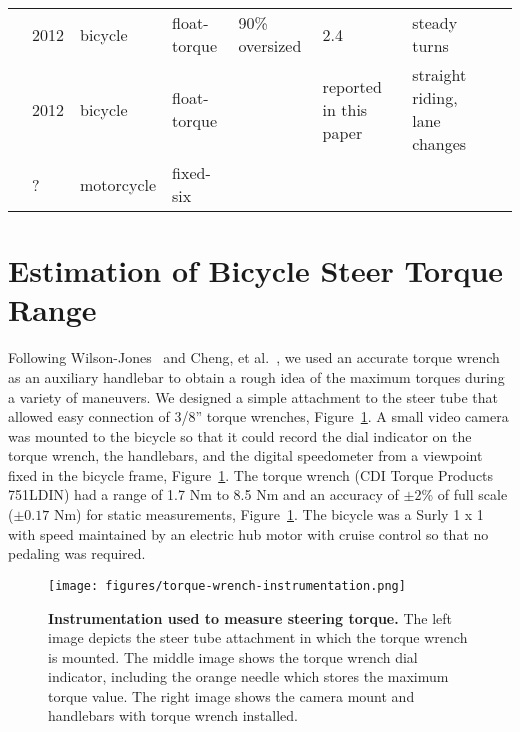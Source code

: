 \documentclass[10pt]{article}
\begin{document}
\begin{landscape}
\begin{table}
\begin{tabular}{llllllll}
    \cite{Cain2010,Cain2012}              &  2012 &     bicycle &      float-torque &    90\% oversized &                      2.4 &                            steady turns &             \\
    \cite{Moore2012}                      &  2012 &     bicycle &      float-torque &                   &   reported in this paper &           straight riding, lane changes &             \\
    \cite{Kageyama}                       &     ? &  motorcycle &         fixed-six &                   &                          &                                         &             \\
    \bottomrule
  \end{tabular}
  \label{tab:design}
\end{table}
\end{landscape}

\section*{Estimation of Bicycle Steer Torque Range}

Following Wilson-Jones~\cite{Wilson-Jones1951} and Cheng, et
al.~\cite{Cheng2003}, we used an accurate torque wrench as an auxiliary
handlebar to obtain a rough idea of the maximum torques during a variety of
maneuvers. We designed a simple attachment to the steer tube that allowed easy
connection of 3/8'' torque wrenches,
Figure~\ref{fig:torque-wrench-instrumentation}. A small video camera was
mounted to the bicycle so that it could record the dial indicator on the torque
wrench, the handlebars, and the digital speedometer from a viewpoint fixed in
the bicycle frame, Figure~\ref{fig:torque-wrench-instrumentation}.  The torque
wrench (CDI Torque Products 751LDIN) had a range of 1.7 Nm to 8.5 Nm and an
accuracy of $\pm2$\% of full scale ($\pm0.17$ Nm) for static measurements,
Figure~\ref{fig:torque-wrench-instrumentation}. The bicycle was a Surly 1 x 1
with speed maintained by an electric hub motor with cruise control so that no
pedaling was required.

\begin{figure}
  \centering
  \texttt{[image: figures/torque-wrench-instrumentation.png]}
  \caption{{\bf Instrumentation used to measure steering torque.}
    The left image depicts the steer tube attachment in which the torque wrench
    is mounted. The middle image shows the torque wrench dial indicator,
    including the orange needle which stores the maximum torque value. The
    right image shows the camera mount and handlebars with torque wrench
    installed.
    }
  \label{fig:torque-wrench-instrumentation}
\end{figure}
\end{document}
